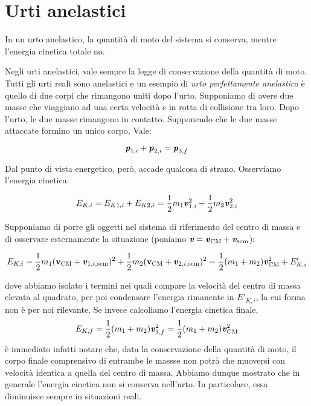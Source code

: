 \section{Urti anelastici}
\begin{tcolorbox}[colback = yellow!30, colframe = yellow!30!black, title = {Urto anelastico}]
    In un urto anelastico, la quantità di moto del sistema si conserva, mentre
    l'energia cinetica totale no.
\end{tcolorbox}
\vspace{5pt}

\noindent Negli urti anelastici, vale sempre la legge di conservazione della quantità
di moto. Tutti gli urti reali sono anelastici e un esempio di \textit{urto perfettamente
anelastico} è quello di due corpi che rimangono uniti dopo l'urto. Supponiamo di avere due masse che viaggiano ad una certa velocità
e in rotta di collisione tra loro. Dopo l'urto, le due masse rimangono
in contatto. Supponendo che le due masse attaccate formino un unico corpo, Vale:

\[ \textbf{\textit{p}}_{1,i} + \textbf{\textit{p}}_{2,i} = \textbf{\textit{p}}_{3,f} \]

\noindent Dal punto di vista energetico, però, accade qualcosa di strano. Osserviamo
l'energia cinetica:

\[ E_{K,i} = E_{K1, i} + E_{K2, i} = \frac12 m_1\textbf{\textit{v}}_{1,i}^2 + \frac12 m_2\textbf{\textit{v}}_{2,i}^2\]

\noindent Supponiamo di porre gli oggetti nel sistema di riferimento del centro di massa
e di osservare esternamente la situazione (poniamo $\textbf{\textit{v}} = \textbf{\textit{v}}_\text{CM} + \textbf{\textit{v}}_\text{scm}$):

\[ E_{K,i} = \frac12 m_1(\textbf{v}_\text{CM} + \textbf{\textit{v}}_{1,i,\text{scm}})^2 + \frac12 m_2(\textbf{v}_\text{CM} + \textbf{\textit{v}}_{2,i,\text{scm}})^2 = \frac12(m_1 + m_2)\textbf{\textit{v}}_\text{CM}^2 + E'_{K,i} \]

\noindent dove abbiamo isolato i termini nei quali compare la velocità del centro di massa
elevata al quadrato, per poi condensare l'energia rimanente in $E'_{K,i}$,
la cui forma non è per noi rilevante. Se invece calcoliamo l'energia cinetica
finale,
\[ E_{K,f} = \frac12 (m_1 + m_2)\textbf{\textit{v}}_{3,f}^2 = \frac12(m_1 + m_2)\textbf{\textit{v}}_\text{CM}^2 \]
è immediato infatti notare che, data la conservazione della quantità di moto,
il corpo finale comprensivo di entrambe le massse non potrà che muoversi
con velocità identica a quella del centro di massa.
Abbiamo dunque mostrato che in generale l'energia cinetica non si conserva nell'urto.
In particolare, essa diminuisce sempre in situazioni reali.


